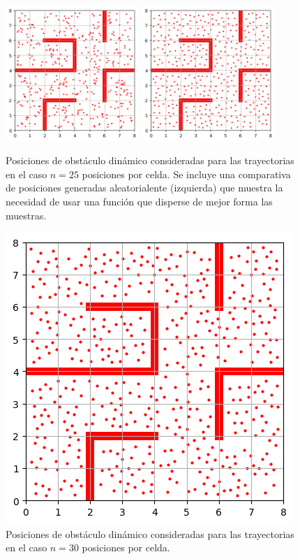 \documentclass[spanish,mexico]{article}
\numberwithin{equation}{section}
\theoremstyle{definition}
\theoremstyle{remark}
\begin{document}
\begin{figure}[!h]
  \centering
	{\includegraphics[width=0.45\textwidth]{img/25alt.png}\label{fig:f1}}
  \hfill
  	{\includegraphics[width=0.45\textwidth]{img/25.png}\label{fig:f2}}
  \caption{Posiciones de obstáculo dinámico consideradas para las trayectorias en el caso $n=25$ posiciones por celda. Se incluye una comparativa de posiciones generadas aleatorialente (izquierda) que muestra la necesidad de usar una función que disperse de mejor forma las muestras.}
\end{figure}

\begin{figure}[h!]
\centering
\includegraphics[scale=0.7]{img/30.png}
\caption{Posiciones de obstáculo dinámico consideradas para las trayectorias en el caso $n=30$ posiciones por celda.}
\end{figure}
\end{document}
